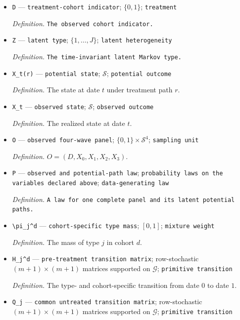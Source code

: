 \documentclass{article}
\begin{document}
\begin{itemize}
  \item \texttt{D} --- \texttt{treatment-\allowbreak{}cohort indicator}; \(\{0,1\}\); \texttt{treatment}
  \par\smallskip\noindent\emph{Definition.} \texttt{The observed cohort indicator.}
  \item \texttt{Z} --- \texttt{latent type}; \(\{1,\ldots,J\}\); \texttt{latent heterogeneity}
  \par\smallskip\noindent\emph{Definition.} \texttt{The time-\allowbreak{}invariant latent Markov type.}
  \item \texttt{X\_\allowbreak{}t(r)} --- \texttt{potential state}; \(\mathcal S\); \texttt{potential outcome}
  \par\smallskip\noindent\emph{Definition.} The state at date \(t\) under treatment path \(r\).
  \item \texttt{X\_\allowbreak{}t} --- \texttt{observed state}; \(\mathcal S\); \texttt{observed outcome}
  \par\smallskip\noindent\emph{Definition.} The realized state at date \(t\).
  \item \texttt{O} --- \texttt{observed four-\allowbreak{}wave panel}; \(\{0,1\}\times\mathcal S^4\); \texttt{sampling unit}
  \par\smallskip\noindent\emph{Definition.} \(O=(D,X_0,X_1,X_2,X_3)\).
  \item \texttt{P} --- \texttt{observed and potential-\allowbreak{}path law}; \texttt{probability laws on the variables declared above}; \texttt{data-\allowbreak{}generating law}
  \par\smallskip\noindent\emph{Definition.} \texttt{A law for one complete panel and its latent potential paths.}
  \item \texttt{\textbackslash{}\allowbreak{}pi\_\allowbreak{}j\textasciicircum{}d} --- \texttt{cohort-\allowbreak{}specific type mass}; \([0,1]\); \texttt{mixture weight}
  \par\smallskip\noindent\emph{Definition.} The mass of type \(j\) in cohort \(d\).
  \item \texttt{H\_\allowbreak{}j\textasciicircum{}d} --- \texttt{pre-\allowbreak{}treatment transition matrix}; row-stochastic \((m+1)\times(m+1)\) matrices supported on \(\mathcal G\); \texttt{primitive transition}
  \par\smallskip\noindent\emph{Definition.} The type- and cohort-specific transition from date \(0\) to date \(1\).
  \item \texttt{Q\_\allowbreak{}j} --- \texttt{common untreated transition matrix}; row-stochastic \((m+1)\times(m+1)\) matrices supported on \(\mathcal G\); \texttt{primitive transition}

\end{itemize}
\end{document}
